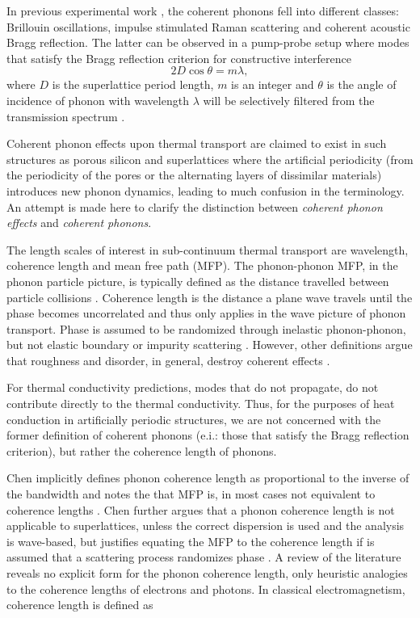 \documentclass[aps,prb,preprint,preprintnumbers,amsmath,amssymb,floatfix,superscriptaddress]{revtex4}
\begin{document}
In previous experimental work \cite{PhysRevLett.73.740,PhysRevB.75.195309}, the coherent phonons fell into different classes: Brillouin oscillations, impulse stimulated Raman scattering and coherent acoustic Bragg reflection. The latter can be observed in a pump-probe setup where modes that satisfy the Bragg reflection criterion for constructive interference
\begin{equation}\label{EQ:Coh}
2D \cos \theta = m \lambda,
\end{equation}
where $D$ is the superlattice period length, $m$ is an integer and $\theta$ is the angle of incidence of phonon with wavelength $\lambda$ will be selectively filtered from the transmission spectrum \cite{PhysRevLett.43.2012}.

Coherent phonon effects upon thermal transport are claimed to exist in such structures as porous silicon \cite{doi:10.1021/nl102918q} and superlattices \cite{PhysRevB.67.195311} where the artificial periodicity (from the periodicity of the pores or the alternating layers of dissimilar materials) introduces new phonon dynamics, leading to much confusion in the terminology. An attempt is made here to clarify the distinction between \textit {coherent phonon effects} and \textit{coherent phonons}.

The length scales of interest in sub-continuum thermal transport are wavelength, coherence length and mean free path (MFP). The phonon-phonon MFP, in the phonon particle picture, is typically defined as the distance travelled between particle collisions \cite{ziman_electrons_2001}. Coherence length is the distance a plane wave travels until the phase becomes uncorrelated and thus only applies in the wave picture of phonon transport. Phase is assumed to be randomized through inelastic phonon-phonon, but not elastic boundary or impurity scattering \cite{chen2005nanoscale}. However, other definitions argue that roughness and disorder, in general, destroy coherent effects \cite{PhysRevB.67.195311,dames:682}.

For thermal conductivity predictions, modes that do not propagate, do not contribute directly to the thermal conductivity. Thus, for the purposes of heat conduction in artificially periodic structures, we are not concerned with the former definition of coherent phonons (e.i.: those that satisfy the Bragg reflection criterion), but rather the coherence length of phonons. 

Chen implicitly defines phonon coherence length as proportional to the inverse of the bandwidth and notes the that MFP is, in most cases not equivalent to coherence lengths \cite {Chen_particularities,chen2005nanoscale}. Chen further argues that a phonon coherence length is not applicable to superlattices, unless the correct dispersion is used and the analysis is wave-based\cite{chen:945}, but justifies equating the MFP to the coherence length if is assumed that a scattering process randomizes phase \cite{PhysRevB.67.195311}. A review of the literature reveals no explicit form for the phonon coherence length, only heuristic analogies to the coherence lengths of electrons and photons. In classical electromagnetism, coherence length is defined as
\end{document}
